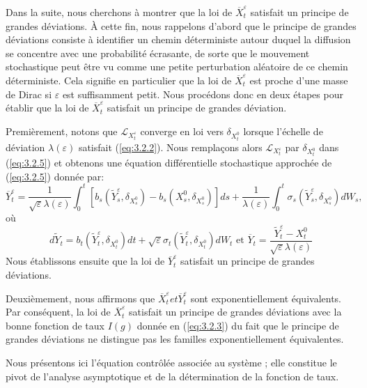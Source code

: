 \documentclass[12pt,a4paper,twoside]{report}%
\theoremstyle{definition}
\numberwithin{equation}{section}
\begin{document}
Dans la suite, nous cherchons à montrer que la loi de $\overline{X}_t^\varepsilon$ satisfait un principe de grandes déviations. À cette fin, nous rappelons d’abord que le principe de grandes déviations consiste à identifier un chemin déterministe autour duquel la diffusion se concentre avec une probabilité écrasante, de sorte que le mouvement stochastique peut être vu comme une petite perturbation aléatoire de ce chemin déterministe. Cela signifie en particulier que la loi de $\overline{X}_t^\varepsilon$ est proche d’une masse de Dirac si $\varepsilon$ est suffisamment petit. Nous procédons donc en deux étapes pour établir que la loi de $\overline{X}_t^\varepsilon$ satisfait un principe de grandes déviation.

Premièrement, notons que $\mathcal{L}_{X_t^\varepsilon}$ converge en loi vers $\delta_{X_t^0}$ lorsque l’échelle de déviation $\lambda(\varepsilon)$ satisfait (\ref{eq:3.2.2}). Nous remplaçons alors $\mathcal{L}_{X_t^\varepsilon}$ par $\delta_{X_t^0}$ dans (\ref{eq:3.2.5}) et obtenons une équation différentielle stochastique approchée de (\ref{eq:3.2.5}) donnée par:
\begin{equation}
	\overline{Y}_t^\varepsilon = \frac{1}{\sqrt{\varepsilon} \lambda(\varepsilon)} \int_0^t [b_s(\widetilde{Y}_s^\varepsilon, \delta_{X_s^0}) - b_s(X_s^0, \delta_{X_s^0})] ds + \frac{1}{\lambda(\varepsilon)} \int_0^t \sigma_s(\widetilde{Y}_s^\varepsilon, \delta_{X_s^0}) dW_s,
\end{equation}
	 où 
	 \[
	 d\widetilde{Y}_t = b_t(\widetilde{Y}_t^\varepsilon, \delta_{X_t^0}) dt + \sqrt{\varepsilon} \sigma_t(\widetilde{Y}_t^\varepsilon, \delta_{X_t^0}) dW_t \text{ et } \overline{Y}_t = \frac{\widetilde{Y}_t^\varepsilon - X_t^0}{\sqrt{\varepsilon} \lambda(\varepsilon)}
	 \]
	 Nous établissons ensuite que la loi de $\overline{Y}_t^\varepsilon$ satisfait un principe de grandes déviations.
	 
	 Deuxièmement, nous affirmons que $\overline{X}^\varepsilon_t et \overline{Y}_t^\varepsilon$ sont exponentiellement équivalents. Par conséquent, la loi de $\overline{X}_t^\varepsilon$ satisfait un principe de grandes déviations avec la bonne fonction de taux $I(g)$ donnée en (\ref{eq:3.2.3}) du fait que le principe de grandes déviations ne distingue pas les familles exponentiellement équivalentes.
	 
	 Nous présentons ici l'équation contrôlée associée au système ; elle constitue le pivot de l'analyse asymptotique et de la détermination de la fonction de taux.
	
\end{document}

